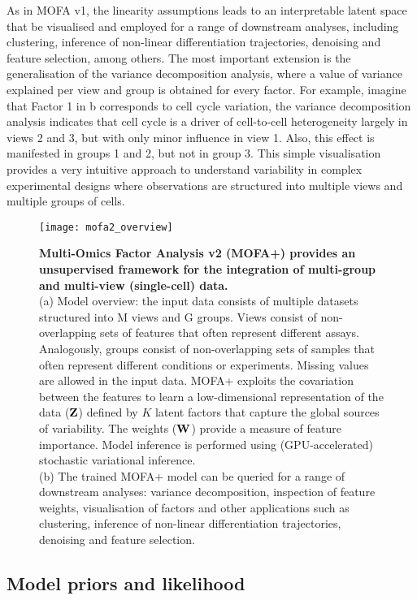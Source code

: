 As in MOFA v1, the linearity assumptions leads to an interpretable latent space that be visualised and employed for a range of downstream analyses, including clustering, inference of non-linear differentiation trajectories, denoising and feature selection, among others. The most important extension is the generalisation of the variance decomposition analysis, where a value of variance explained per view and group is obtained for every factor. For example, imagine that Factor 1 in b corresponds to cell cycle variation, the variance decomposition analysis indicates that cell cycle is a driver of cell-to-cell heterogeneity largely in views 2 and 3, but with only minor influence in view 1. Also, this effect is manifested in groups 1 and 2, but not in group 3. This simple visualisation provides a very intuitive approach to understand variability in complex experimental designs where observations are structured into multiple views and multiple groups of cells.

\begin{figure}[H]
	\centering
	\texttt{[image: mofa2\_overview]}
	\caption[]{\textbf{Multi-Omics Factor Analysis v2 (MOFA+) provides an unsupervised framework for the integration of multi-group and multi-view (single-cell) data.}\\
	(a) Model overview: the input data consists of multiple datasets structured into M views and G groups. Views consist of non-overlapping sets of features that often represent different assays. Analogously, groups consist of non-overlapping sets of samples that often represent different conditions or experiments. Missing values are allowed in the input data. MOFA+ exploits the covariation between the features to learn a low-dimensional representation of the data (${\bf Z}$) defined by $K$ latent factors that capture the global sources of variability. The weights (${\bf W}$) provide a measure of feature importance. Model inference is performed using (GPU-accelerated) stochastic variational inference. \\
	(b) The trained MOFA+ model can be queried for a range of downstream analyses: variance decomposition, inspection of feature weights, visualisation of factors and other applications such as clustering, inference of non-linear differentiation trajectories, denoising and feature selection.
	}
	\label{fig:mofa2_overview}
\end{figure}


\subsection{Model priors and likelihood}

